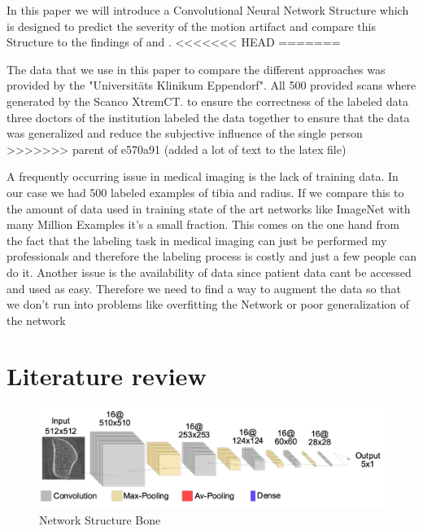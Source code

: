 \documentclass[
a4paper, 
12pt,
grayscalebody, %
abstract=on,
twoside, BCOR10mm, 12pt, DIV13,headinclude, footexclude, final, abstracton, openright
]{ibireprt}
\numberwithin{equation}{chapter}
\numberwithin{table}{chapter}
\numberwithin{figure}{chapter}
\numberwithin{algorithm}{chapter}
\numberwithin{example}{chapter}
\numberwithin{example}{chapter}
\begin{document}
In this paper we will introduce a Convolutional Neural Network Structure which is designed to predict the severity of the motion artifact and compare this Structure to the findings of \cite{Sode2011} and \cite{Walle2023}. 
<<<<<<< HEAD
=======

The data that we use in this paper to compare the different approaches was provided by the "Universitäts Klinikum Eppendorf". All 500 provided scans where generated by the Scanco XtremCT.%
to ensure the correctness of the labeled data three doctors of the institution labeled the data together to ensure that the data was generalized and reduce the subjective influence of the single person  
>>>>>>> parent of e570a91 (added a lot of text to the latex file)


A frequently occurring issue in medical imaging is the lack of training data. In our case we had 500 labeled examples of tibia and radius. If we compare this to the amount of data used in training state of the art networks like ImageNet with many Million Examples it's a small fraction. This comes on the one hand from the fact that the labeling task in medical imaging can just be performed my professionals and therefore the labeling process is costly and just a few people can do it. Another issue is the availability of data since patient data cant be accessed and used as easy. Therefore we need to find a way to augment the data so that we don't run into problems like overfitting the Network or poor generalization of the network
\chapter{Literature review}

\begin{figure}[h]	
	\center
	\includegraphics[width = 1 \textwidth]{Bone_Network_Structure.png}%
	\caption{Network Structure Bone}
	\label{fig:fig1}
\end{figure}%
\end{document}
